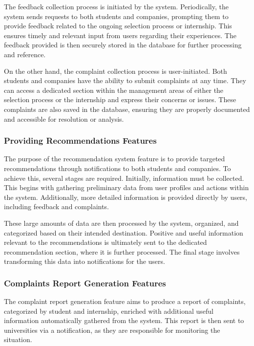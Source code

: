 The feedback collection process is initiated by the system. Periodically, the system sends requests
to both students and companies, prompting them to provide feedback related to the ongoing selection
process or internship. This ensures timely and relevant input from users regarding their experiences. 
The feedback provided is then securely stored in the database for further processing and reference.

On the other hand, the complaint collection process is user-initiated. Both students and companies
have the ability to submit complaints at any time. They can access a dedicated section within the 
management areas of either the selection process or the internship and express their concerns or issues.
These complaints are also saved in the database, ensuring they are properly documented and accessible 
for resolution or analysis.

\subsubsection{Providing Recommendations Features}

The purpose of the recommendation system feature is to provide targeted recommendations through
notifications to both students and companies. To achieve this, several stages are required.
Initially, information must be collected. This begins with gathering preliminary data from
user profiles and actions within the system. Additionally, more detailed information is
provided directly by users, including feedback and complaints.

These large amounts of data are then processed by the system, organized, and categorized
based on their intended destination. Positive and useful information relevant to the
recommendations is ultimately sent to the dedicated recommendation section, where it is
further processed. The final stage involves transforming this data into notifications for the users.

\subsubsection{Complaints Report Generation Features}

The complaint report generation feature aims to produce a report of complaints, categorized by student
and internship, enriched with additional useful information automatically gathered from the system.
This report is then sent to universities via a notification, as they are responsible for monitoring
the situation.

